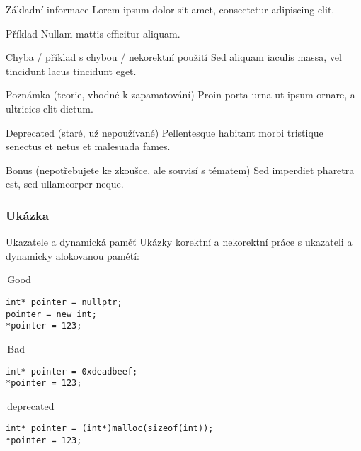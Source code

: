 

\begin{frame}[fragile]
\vfill
\begin{block}{Základní informace} 
Lorem ipsum dolor sit amet, consectetur adipiscing elit.
\end{block}
\vfill
\begin{exampleblock}{Příklad}
Nullam mattis efficitur aliquam.
\end{exampleblock}
\vfill
\begin{alertblock}{Chyba / příklad s chybou / nekorektní použití} 
Sed aliquam iaculis massa, vel tincidunt lacus tincidunt eget.
\end{alertblock}
\vfill
\begin{noteblock}{Poznámka (teorie, vhodné k zapamatování)}
Proin porta urna ut ipsum ornare, a ultricies elit dictum.
\end{noteblock}
\vfill
\begin{deprecatedblock}{Deprecated (staré, už nepoužívané)} 
Pellentesque habitant morbi tristique senectus et netus et malesuada fames. 
\end{deprecatedblock}
\vfill
\begin{bonusblock}{Bonus (nepotřebujete ke zkoušce, ale souvisí s tématem)}
Sed imperdiet pharetra est, sed ullamcorper neque. 
\end{bonusblock}
\vfill
\end{frame}


\begin{frame}[fragile]
\frametitle{Ukázka}
\vfill
\begin{block}{Ukazatele a dynamická paměť}
Ukázky korektní a nekorektní práce s ukazateli a dynamicky alokovanou pamětí:
\end{block}
\vfill
\begin{twocols}

\begin{exampleblock}{\YES\,Good}
\begin{lstlisting}
int* pointer = nullptr;
pointer = new int;
*pointer = 123;
\end{lstlisting}
\end{exampleblock}
\twocolssep
\begin{alertblock}{\NO\,Bad}
\begin{lstlisting}
int* pointer = 0xdeadbeef;
*pointer = 123;
\end{lstlisting}
\end{alertblock}

\end{twocols}
\vfill
\begin{deprecatedblock}{\WARNING\,deprecated}
\begin{lstlisting}
int* pointer = (int*)malloc(sizeof(int));
*pointer = 123;
\end{lstlisting}
\end{deprecatedblock}
\vfill
\end{frame}



